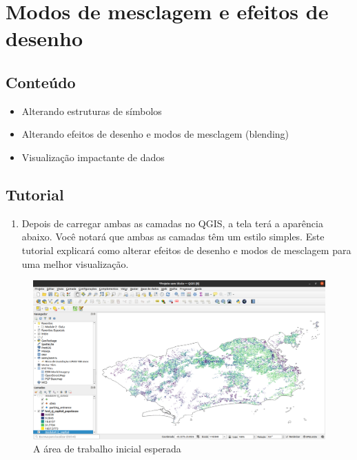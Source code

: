 \documentclass[
  portuguese,
]{krantz}
\providecommand{\tightlist}{%
  \setlength{\itemsep}{0pt}\setlength{\parskip}{0pt}}
\begin{document}
\hypertarget{modos-de-mesclagem-e-efeitos-de-desenho}{%
\section{Modos de mesclagem e efeitos de desenho}\label{modos-de-mesclagem-e-efeitos-de-desenho}}

\hypertarget{conteuxfado-1}{%
\subsection{\texorpdfstring{\textbf{Conteúdo}}{Conteúdo}}\label{conteuxfado-1}}

\begin{itemize}
\tightlist
\item
  Alterando estruturas de símbolos
\item
  Alterando efeitos de desenho e modos de mesclagem (blending)
\item
  Visualização impactante de dados
\end{itemize}

\hypertarget{tutorial}{%
\subsection{\texorpdfstring{\textbf{Tutorial}}{Tutorial}}\label{tutorial}}

\begin{enumerate}
\def\labelenumi{\arabic{enumi}.}
\tightlist
\item
  Depois de carregar ambas as camadas no QGIS, a tela terá a aparência abaixo. Você notará que ambas as camadas têm um estilo simples. Este tutorial explicará como alterar efeitos de desenho e modos de mesclagem para uma melhor visualização.
\end{enumerate}

\begin{figure}
\centering
\includegraphics{media/modulo4/initial-workspace.png}
\caption{A área de trabalho inicial esperada}
\end{figure}
\end{document}
